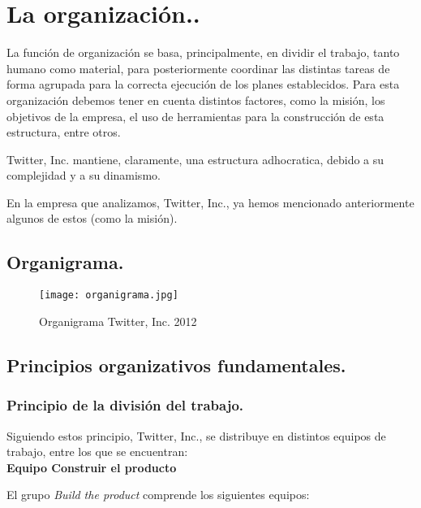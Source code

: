 
\section{La organización..}

La función de organización se basa, principalmente, en dividir el trabajo, tanto humano como material, para posteriormente coordinar las distintas tareas de forma agrupada para la correcta ejecución de los planes establecidos. Para esta organización debemos tener en cuenta distintos factores, como la misión, los objetivos de la empresa, el uso de herramientas para la construcción de esta estructura, entre otros.

Twitter, Inc. mantiene, claramente, una estructura adhocratica, debido a su complejidad y a su dinamismo.

En la empresa que analizamos, Twitter, Inc., ya hemos mencionado anteriormente algunos de estos (como la misión).

\newpage
\subsection{Organigrama.}

\begin{figure}[!htb]
\centering
\texttt{[image: organigrama.jpg]}
\caption{\label{fig:frog}Organigrama Twitter, Inc. 2012}
\end{figure}



\subsection{Principios organizativos fundamentales.}

\subsubsection{Principio de la división del trabajo.}

Siguiendo estos principio, Twitter, Inc., se distribuye en distintos equipos de trabajo, entre los que se encuentran:\\

\textbf{Equipo Construir el producto}

El grupo \textit{Build the product} comprende los siguientes equipos:

